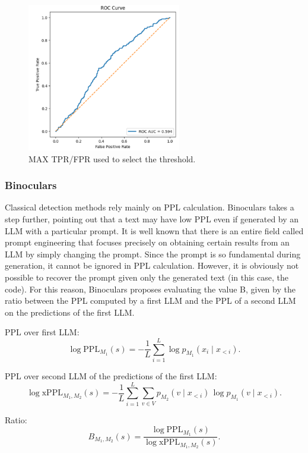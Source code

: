 \begin{figure}[H]
    \centering
    \includegraphics[width=0.6\textwidth]{img/LLMPPL/AUC.png}
    \caption{MAX TPR/FPR used to select the threshold.}
    \label{fig:TPR/FPR used to select the threshold.}
\end{figure}



\subsubsection{Binoculars}
\newcommand{\PPL}{\mathrm{PPL}}
\newcommand{\xPPL}{\mathrm{xPPL}}
Classical detection methods rely mainly on PPL calculation. 
Binoculars takes a step further, pointing out that a text may 
have low PPL even if generated by an LLM with a particular prompt. 
It is well known that there is an entire field called prompt 
engineering that focuses precisely on obtaining certain results 
from an LLM by simply changing the prompt. Since the prompt is so 
fundamental during generation, it cannot be ignored in PPL calculation. 
However, it is obviously not possible to recover the prompt given only 
the generated text (in this case, the code). For this reason, 
Binoculars proposes evaluating the value 
B, given by the ratio between the PPL computed by a first LLM and the PPL of a second LLM on the predictions of the first LLM.

PPL over first LLM:
\[
\log \PPL_{M_1}(s)
= -\frac{1}{L}\sum_{i=1}^{L}\log p_{M_1}(x_i\mid x_{<i}).
\]

PPL over second LLM of the predictions of the first LLM:
\[
\log \xPPL_{M_1,M_2}(s)
= -\frac{1}{L}\sum_{i=1}^{L}\sum_{v\in V}
p_{M_2}(v\mid x_{<i})\,\log p_{M_1}(v\mid x_{<i}).
\]

Ratio:
\[
B_{M_1,M_2}(s)=\frac{\log \PPL_{M_1}(s)}{\log \xPPL_{M_1,M_2}(s)}.
\]

